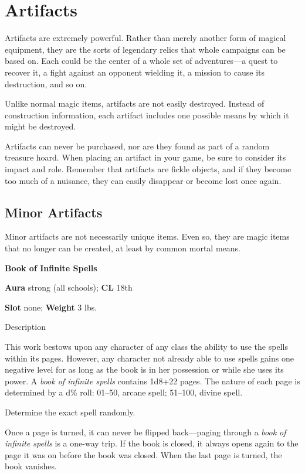 \section{Artifacts}

\label{f0}				
Artifacts are extremely powerful. Rather than merely another form of magical equipment, they are the sorts of legendary relics that whole campaigns can be based on. Each could be the center of a whole set of adventures---a quest to recover it, a fight against an opponent wielding it, a mission to cause its destruction, and so on. 
				
Unlike normal magic items, artifacts are not easily destroyed. Instead of construction information, each artifact includes one possible means by which it might be destroyed.
				
Artifacts can never be purchased, nor are they found as part of a random treasure hoard. When placing an artifact in your game, be sure to consider its impact and role. Remember that artifacts are fickle objects, and if they become too much of a nuisance, they can easily disappear or become lost once again.
				
\subsection{Minor Artifacts}

				
Minor artifacts are not necessarily unique items. Even so, they are magic items that no longer can be created, at least by common mortal means.
				
\textbf{Book of Infinite Spells}
				
\textbf{Aura} strong (all schools); \textbf{CL} 18th
				
\textbf{Slot} none; \textbf{Weight} 3 lbs.
				
Description
				
This work bestows upon any character of any class the ability to use the spells within its pages. However, any character not already able to use spells gains one 
negative level for as long as the book is in her possession or while she uses its power. A 
\textit{book of infinite spells}
 contains 1d8+22 pages. The nature of each page is determined by a d\% roll: 01--50, arcane spell; 51--100, divine spell. 
				
Determine the exact spell randomly.
				
Once a page is turned, it can never be flipped back---paging through a \textit{book of infinite spells }is a one-way trip. If the book is closed, it always opens again to the page it was on before the book was closed. When the last page is turned, the book vanishes.
				
